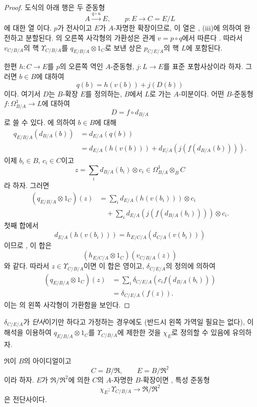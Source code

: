 \begin{proof}
도식의 아래 행은 두 준동형
\[
  A\xrightarrow{q\circ u}E,\qquad p:E\to C=E/L
\]
에 대한 열 이다. $p$가 전사이고 $E$가
$A$-자명한 확장이므로, 이 열은 , (iii)에
의하여 완전하고 분할된다. 의 오른쪽 사각형의
가환성은 관계 $v=p\circ q$에서 따른다
. 따라서 $v_{C/B/A}$의 핵
$\Upsilon_{C/B/A}$를 $q_{E/B/A}\otimes1_C$로 보낸 상은
$p_{C/E/A}$의 핵 $L$에 포함된다.

한편 $h:C\to E$를 $p$의 오른쪽 역인 $A$-준동형,
$j:L\to E$를 표준 포함사상이라 하자. 그러면 $b\in B$에 대하여
\[
  q(b)=h(v(b))+j(D(b))
\]
이다. 여기서 $D$는 $B$-확장 $E$를 정의하는, $B$에서 $L$로
가는 $A$-미분이다. 어떤 $B$-준동형
$f:\Omega^1_{B/A}\to L$에 대하여
\[
  D=f\circ d_{B/A}
\]
로 쓸 수 있다. 에 의하여 $b\in B$에 대해
\[
\begin{split}
  q_{E/B/A}(d_{B/A}(b))
  &=d_{E/A}(q(b))\\
  &=d_{E/A}(h(v(b)))
    +d_{E/A}(j(f(d_{B/A}(b)))).
\end{split}
\]
이제 $b_i\in B$, $c_i\in C$이고
\[
  z=\sum_i d_{B/A}(b_i)\otimes c_i
  \in\Omega^1_{B/A}\otimes_B C
\]
라 하자. 그러면
\[
\begin{split}
  (q_{E/B/A}\otimes1_C)(z)
  &=
  \sum_i d_{E/A}(h(v(b_i)))\otimes c_i\\
  &\quad+
  \sum_i d_{E/A}(j(f(d_{B/A}(b_i))))\otimes c_i.
\end{split}
\]
첫째 합에서
\[
  d_{E/A}(h(v(b_i)))
  =h_{E/C/A}(d_{C/A}(v(b_i)))
\]
이므로 , 이 합은
\[
  (h_{E/C/A}\otimes1_C)(v_{C/B/A}(z))
\]
와 같다. 따라서 $z\in\Upsilon_{C/B/A}$이면 이 합은 영이고,
$\delta_{C/E/A}$의 정의에 의하여
\[
\begin{split}
  (q_{E/B/A}\otimes1_C)(z)
  &=\sum_i\delta_{C/E/A}
    (c_i f(d_{B/A}(b_i)))\\
  &=\delta_{C/E/A}(f(z)).
\end{split}
\]
이는 의 왼쪽 사각형이 가환함을 보인다.
\end{proof}

$\delta_{C/E/A}$가 \emph{단사}이기만 하다고 가정하는 경우에도
(반드시 왼쪽 가역일 필요는 없다), 이 해석을 이용하여
$q_{E/B/A}\otimes1_C$를 $\Upsilon_{C/B/A}$에 제한한 것을
$\chi_E$로 정의할 수 있음에 유의하자.

\begin{corollary}[20.6.10]
\label{0.20.6.10-ko}
$\mathfrak R$이 $B$의 아이디얼이고
\[
  C=B/\mathfrak R,\qquad E=B/\mathfrak R^2
\]
이라 하자. $E$가 $\mathfrak R/\mathfrak R^2$에 의한 $C$의
$A$-자명한 $B$-확장이면 , 특성 준동형
\[
  \chi_E:\Upsilon_{C/B/A}\to\mathfrak R/\mathfrak R^2
\]
은 전단사이다.
\end{corollary}

